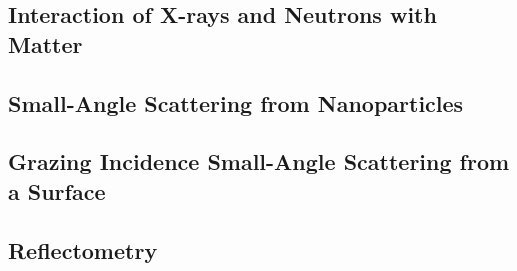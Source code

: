 \documentclass[\main/dresen_thesis.tex]{subfiles}
\begin{document}
\subsection{Interaction of X-rays and Neutrons with Matter}\label{sec:theoreticalBackground:scattering:interactionWithMatter}
\subsection{Small-Angle Scattering from Nanoparticles}\label{sec:theoreticalBackground:scattering:SASNanoparticles}
\subsection{Grazing Incidence Small-Angle Scattering from a Surface}\label{sec:theoreticalBackground:scattering:GISAS}
\subsection{Reflectometry}\label{sec:theoreticalBackground:scattering:reflectometry}
\end{document}
